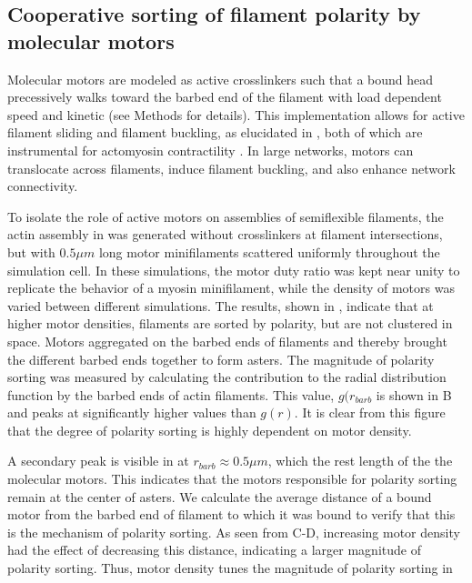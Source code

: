 \documentclass[12pt]{article}
\begin{document}
\subsection{Cooperative sorting of filament polarity by molecular motors}
Molecular motors are modeled as active crosslinkers such that a bound head 
precessively walks toward the barbed end of the filament with load dependent 
speed and kinetic (see Methods for details).
This implementation allows for active filament sliding and filament buckling, 
as elucidated in \cite{freedman2016},
both of which are instrumental for actomyosin contractility \cite{murrell2012}.
In large networks, motors can translocate across filaments, induce filament 
buckling, and also enhance network connectivity\cite{murrell2014}. 
\par
To isolate the role of active motors on assemblies of semiflexible filaments,
the actin assembly in  was generated without crosslinkers at
filament intersections, but with $0.5\mu m$ long motor minifilaments
scattered uniformly throughout the simulation cell. In these simulations, the 
motor duty ratio was kept near unity to replicate the behavior of a myosin 
minifilament, while the density of motors was varied between different
simulations. The results, shown in , indicate that at
higher motor densities, filaments are sorted by polarity, but are 
not clustered in space. Motors aggregated on the barbed ends of filaments
and thereby brought the different barbed ends together to form asters.
The magnitude of polarity sorting was measured by calculating the contribution 
to the radial distribution function by the barbed ends of actin filaments.
This value, $g(r_{barb}$ is shown in B and peaks at
significantly higher values than $g(r)$. It is clear from this 
figure that the degree of polarity sorting is highly dependent on motor density.
\par
A secondary peak is visible in  at 
$r_{barb}\approx0.5\mu m$, which the rest length of the the molecular motors. 
This indicates that the motors responsible for polarity sorting remain at the 
center of asters. We calculate the average distance of a bound motor from the 
barbed end of filament to which it was bound to verify that this is the 
mechanism of polarity sorting. 
As seen from C-D, increasing motor density had the
effect of decreasing this distance, indicating a larger magnitude of polarity
sorting. Thus, motor density tunes the magnitude of polarity sorting in 
\end{document}
